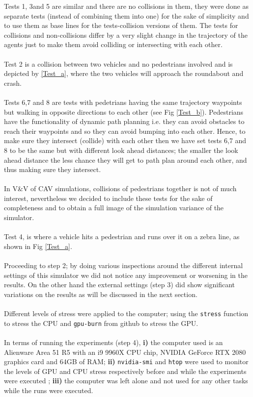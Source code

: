 \noindent Tests 1, 3and 5 are similar and there are no collisions in them, they were done as separate tests (instead of combining them into one) for the sake of simplicity and to use them as base lines for the tests-collision versions of them. The tests for collisions and non-collisions differ by a very slight change in the trajectory of the agents just to make them avoid colliding or intersecting with each other. \\\\ 
Test 2 is a collision between two vehicles and no pedestrians involved and is depicted by \ref{Test_a}, where the two vehicles will approach the roundabout and crash.\\\\
Tests 6,7 and 8 are tests with pedetrians having the same trajectory waypoints but walking in opposite directions to each other (see Fig \ref{Test_b}). 
Pedestrians have the functionality of dynamic path planning i.e. they can avoid obstacles to reach their waypoints and so they can avoid bumping into each other. 
Hence, to make sure they intersect (collide) with each other then we  have set tests 6,7 and 8 to be the same but with different look ahead distances; the smaller the look ahead distance the less chance they will get to path plan around each other, and thus making sure they intersect.\\\\ 
In V\&V of CAV simulations, collisions of pedestrians together is not of much interest, nevertheless we decided to include these tests for the sake of completeness and to obtain a full image of the simulation variance of the simulator.\\\\
Test 4, is where a vehicle hits a pedestrian and runs over it on a zebra line, as shown in Fig \ref{Test_a}.\\\\
Proceeding to step 2; by doing various inspections around the different internal settings of this simulator we did not notice any improvement or worsening in the results. 
On the other hand the external settings (step 3) did show significant variations on the results as will be discussed in the next section. \\\\
Different levels of stress were applied to the computer; using the \texttt{stress} function \cite{CPU_stress} to stress the CPU and \texttt{gpu-burn} from github \cite{GPU_stress} to stress the GPU.\\\\ 
In terms of running the experiments (step 4), \textbf{i)} the computer used is an Alienware Area 51 R5 with an i9 9960X CPU chip, NVIDIA GeForce RTX 2080 graphics card and 64GB of RAM; \textbf{ii)} \texttt{nvidia-smi} and \texttt{htop} were used to monitor the levels of GPU and CPU stress respectively before and while the experiments were executed \cite{monitoring_stresses}; \textbf{iii)} the computer was left alone and not used for any other tasks while the runs were executed.

